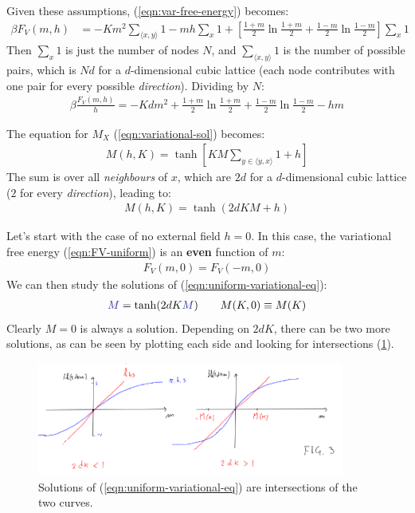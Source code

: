 \documentclass[../../main.tex]{subfiles}
\begin{document}
\medskip

Given these assumptions, (\ref{eqn:var-free-energy}) becomes:
\begin{align*}
    \beta F_V(m, h) &= -K m^2 \sum_{\langle x,y \rangle} 1 - mh\sum_x1 + \left[\frac{1+m}{2} \ln \frac{1+m}{2} + \frac{1-m}{2} \ln \frac{1-m}{2} \right] \sum_x 1 
\end{align*}
Then $\sum_x 1$ is just the number of nodes $N$, and $\sum_{\langle x,y \rangle} 1$ is the number of possible pairs, which is $N d$ for a $d$-dimensional cubic lattice (each node contributes with one pair for every possible \textit{direction}). Dividing by $N$:
\begin{align}\label{eqn:FV-uniform}
    \beta \frac{F_V(m,h)}{h} = - K d m^2 + \frac{1+m}{2} \ln \frac{1+m}{2} + \frac{1-m}{2} \ln \frac{1-m}{2} - hm   
\end{align}

The equation for $M_X$ (\ref{eqn:variational-sol}) becomes:
\begin{align*}
    M(h, K) = \tanh \left[KM \sum_{y \in \langle y, x\rangle} 1 + h\right]
\end{align*}
The sum is over all \textit{neighbours} of $x$, which are $2d$ for a $d$-dimensional cubic lattice ($2$ for every \textit{direction}), leading to:
\begin{align}
    \label{eqn:uniform-variational-eq}
    M(h,K) = \tanh(2dKM + h)
\end{align} 

Let's start with the case of no external field $h=0$. 
In this case, the variational free energy (\ref{eqn:FV-uniform}) is an \textbf{even}  function of $m$: 
\begin{align*}
    F_V(m,0) = F_V(-m,0)
\end{align*}
We can then study the solutions of (\ref{eqn:uniform-variational-eq}):
\begin{align}\label{eqn:h0case}
    \textcolor{Blue}{M} = \tanh(2dK\textcolor{Blue}{M}) \qquad M(K,0) \equiv M(K)
\end{align}
Clearly $M=0$ is always a solution. Depending on $2dK$, there can be two more solutions, as can be seen by plotting each side and looking for intersections (\ref{fig:uniformh0}).

\begin{figure}[H]
    \centering
    \includegraphics[width=0.9\textwidth]{uniformh0.png}
    \caption{Solutions of (\ref{eqn:uniform-variational-eq}) are intersections of the two curves.}
    \label{fig:uniformh0}
\end{figure}
\end{document}

